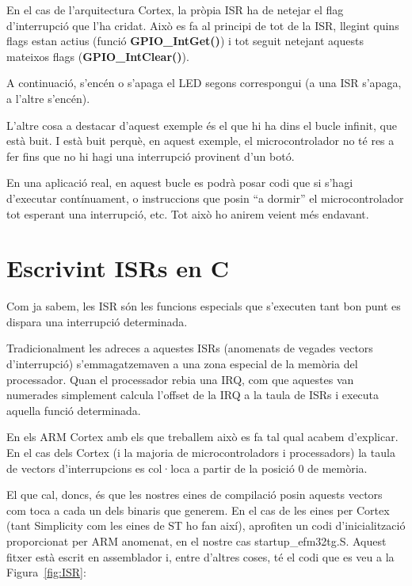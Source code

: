 En el cas de l'arquitectura Cortex, la pròpia ISR ha de netejar el \gls{flag} d'interrupció que l'ha cridat. Això es fa al principi de tot de la \gls{ISR}, llegint quins \glspl{flag} estan actius (funció {\bf GPIO\_IntGet()}) i tot seguit netejant aquests mateixos \glspl{flag} ({\bf GPIO\_IntClear()}).

A continuació, s'encén o s'apaga el LED segons correspongui (a una ISR s'apaga, a l'altre s'encén).

L'altre cosa a destacar d'aquest exemple és el que hi ha dins el bucle infinit, que està buit. I està buit perquè, en aquest exemple, el microcontrolador no té res a fer fins que no hi hagi una interrupció provinent d'un botó.

En una aplicació real, en aquest bucle es podrà posar codi que si s'hagi d'executar contínuament, o instruccions que posin “a dormir” el microcontrolador tot esperant una interrupció, etc. Tot això ho anirem veient més endavant.

\section{Escrivint ISRs en C}
\label{sec:IRQ_example}
Com ja sabem, les \gls{ISR} són les funcions especials que s'executen tant bon punt es dispara una interrupció determinada.

Tradicionalment les adreces a aquestes \glspl{ISR} (anomenats de vegades vectors d'interrupció) s'emmagatzemaven a una zona especial de la memòria del processador. Quan el processador rebia una \gls{IRQ}, com que aquestes van numerades simplement calcula l'offset de la IRQ a la taula de ISRs i executa aquella funció determinada.

En els ARM Cortex amb els que treballem això es fa tal qual acabem d'explicar. En el cas dels Cortex (i la majoria de microcontroladors i processadors) la taula de vectors d'interrupcions es col·loca a partir de la posició 0 de memòria.

El que cal, doncs, és que les nostres eines de compilació posin aquests vectors com toca a cada un dels binaris que generem. En el cas de les eines per Cortex (tant Simplicity com les eines de ST ho fan així), aprofiten un codi d'inicialització proporcionat per ARM anomenat, en el nostre cas startup\_efm32tg.S. Aquest fitxer està escrit en assemblador i, entre d'altres coses, té el codi que es veu a la Figura~\ref{fig:ISR}:

